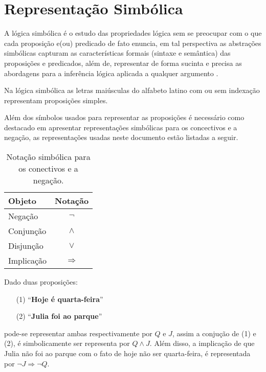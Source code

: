 \section{Representação Simbólica}\label{sec:LogicsSimbolic}

A lógica simbólica é o estudo das propriedades lógica sem se preocupar com o que cada proposição e(ou) predicado de fato enuncia, em tal perspectiva as abstrações simbólicas capturam as características formais (sintaxe e semântica) das proposições e predicados, além de, representar de forma sucinta e precisa as abordagens para a inferência lógica aplicada a qualquer argumento \cite{russel1910principia, hamilton1988logic}.

\begin{definicao}\label{def:SimbolosProposicionais}
  Na lógica simbólica as letras maiúsculas do alfabeto latino com ou sem indexação representam  proposições simples.
\end{definicao}

Além dos símbolos usados para representar as proposições é necessário como destacado em \cite{leonidas2002} apresentar representações simbólicas para os concectivos e a negação, as representações usadas neste documento estão listadas a seguir.

\begin{table}[h]
	\centering
	\begin{tabular}{lc}
		\hline
		\textbf{Objeto} & \textbf{Notação}\\
		\hline
		Negação & $\neg$\\
		Conjunção & $\land$\\
		Disjunção & $\lor$\\
		Implicação & $\Rightarrow$\\
		\hline
	\end{tabular}
	\caption{Notação simbólica para os conectivos e a negação.}
\end{table}

\begin{exemplo}\label{exe:RepresentacaoSimbolica1}
	Dado duas proposições: 
	\begin{itemize}
		\item[(1)] ``\textbf{Hoje é quarta-feira}''
		\item[(2)] ``\textbf{Julia foi ao parque}''
	\end{itemize}
	pode-se representar ambas respectivamente por $Q$ e $J$, assim a conjução de (1) e (2), é simbolicamente ser representa por $Q \land J$. Além disso, a implicação de que Julia não foi ao parque com o fato de hoje não ser quarta-feira, é representada por $\neg J \Rightarrow \neg Q$.
\end{exemplo}

